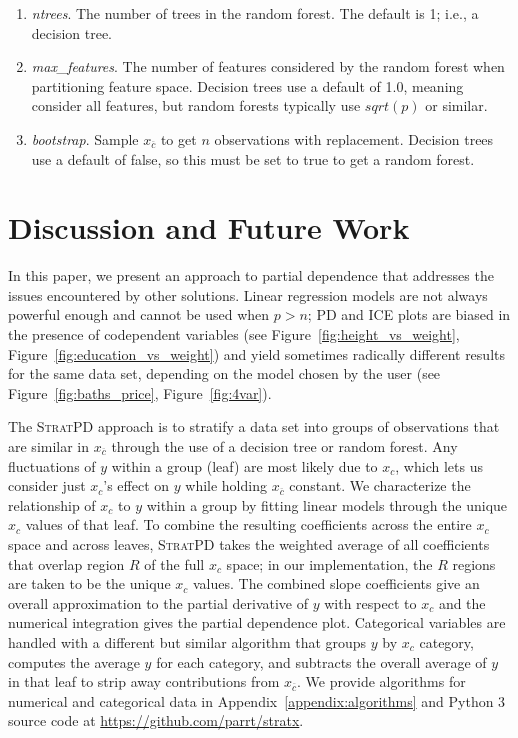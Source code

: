 \documentclass[12pt]{article}
\newcommand{\appdxref}[1]{Appendix~\ref{#1}}
\newcommand{\figref}[1]{Figure~\ref{#1}}
\newcommand{\spd}{\fontfamily{cmr}\textsc{\small StratPD}}
\newcommand{\xnc}{$x_{\overline{c}}$}
\begin{document}
\begin{enumerate}
\item {\it ntrees}. The number of trees in the random forest. The default is 1; i.e., a decision tree.
\item {\it max\_features}. The number of features considered by the random forest when partitioning feature space. Decision trees use a default of 1.0, meaning consider all features, but random forests typically use $sqrt(p)$ or similar.
\item {\it bootstrap}.  Sample \xnc{} to get $n$ observations with replacement. Decision trees use a default of false, so this must be set to true to get a random forest.
\end{enumerate}

\section{Discussion and Future Work}

In this paper, we present an approach to partial dependence that addresses the issues encountered by other solutions.  Linear regression models are not always powerful enough and cannot be used when $p>n$; PD and ICE plots are biased in the presence of codependent variables (see \figref{fig:height_vs_weight}, \figref{fig:education_vs_weight}) and yield sometimes radically different results for the same data set, depending on the model chosen by the user (see \figref{fig:baths_price}, \figref{fig:4var}).

The \spd{}  approach is to stratify a data set into groups of observations that are similar in \xnc{} through the use of a decision tree or random forest. Any fluctuations of $y$ within a group (leaf) are most likely due to $x_c$, which lets us consider just $x_c$'s effect on $y$ while holding \xnc{} constant. We characterize the relationship of $x_c$ to $y$ within a group by fitting linear models through the unique $x_c$ values of that leaf.  To combine the resulting coefficients across the entire $x_c$ space and across leaves, \spd{} takes the weighted average of all coefficients that overlap region $R$ of the full $x_c$ space; in our implementation, the $R$ regions are taken to be the unique $x_c$ values. The combined slope coefficients give an overall approximation to the partial derivative of $y$ with respect to $x_c$ and the numerical integration gives the partial dependence plot. Categorical variables are handled with a different but similar algorithm that groups $y$ by $x_c$ category, computes the average $y$ for each category, and subtracts the overall average of $y$ in that leaf to strip away contributions from \xnc. We provide algorithms for numerical and categorical data in \appdxref{appendix:algorithms} and Python 3 source code at {\small \url{https://github.com/parrt/stratx}}.
\end{document}
